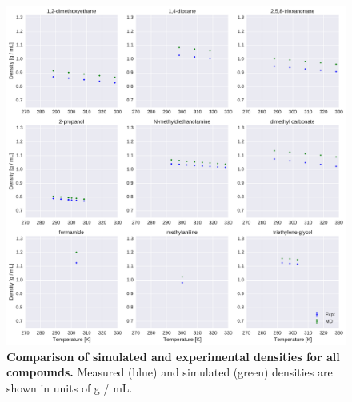 \documentclass[aps,pre,twocolumn,nofootinbib,superscriptaddress,linenumbers]{revtex4-1}
\begin{document}
\begin{figure}[alldensity]

\ContinuedFloat

\includegraphics[width=\textwidth]{./figures/densities_versus_temperature_part3.pdf}

\caption{{\bf Comparison of simulated and experimental densities for all compounds.} 
Measured (blue) and simulated (green) densities are shown in units of g / mL.
\label{figure:AllDensities}
}

\end{figure}
\end{document}
